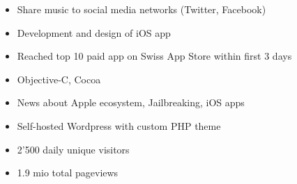 \begin{itemize}
	\item Share music to social media networks (Twitter, Facebook)
	\item Development and design of iOS app
	\item Reached top 10 paid app on Swiss App Store within first 3 days
	\item Objective-C, Cocoa
\end{itemize}

\divider

\begin{itemize}
	\item News about Apple ecosystem, Jailbreaking, iOS apps
	\item Self-hosted Wordpress with custom PHP theme
	\item 2'500 daily unique visitors
	\item 1.9 mio total pageviews
\end{itemize}